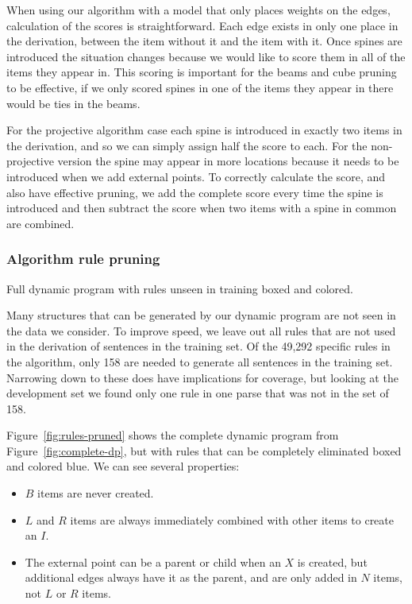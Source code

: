When using our algorithm with a model that only places weights on the edges, calculation of the scores is straightforward.
Each edge exists in only one place in the derivation, between the item without it and the item with it.
Once spines are introduced the situation changes because we would like to score them in all of the items they appear in.
This scoring is important for the beams and cube pruning to be effective, if we only scored spines in one of the items they appear in there would be ties in the beams.

For the projective algorithm case each spine is introduced in exactly two items in the derivation, and so we can simply assign half the score to each.
For the non-projective version the spine may appear in more locations because it needs to be introduced when we add external points.
To correctly calculate the score, and also have effective pruning, we add the complete score every time the spine is introduced and then subtract the score when two items with a spine in common are combined.

\subsubsection{Algorithm rule pruning}

\begin{algorithm}

\caption{\label{fig:rules-pruned}
Full dynamic program with rules unseen in training boxed and colored.
}
\end{algorithm}

Many structures that can be generated by our dynamic program are not seen in the data we consider.
To improve speed, we leave out all rules that are not used in the derivation of sentences in the training set.
Of the 49,292 specific rules in the algorithm, only 158 are needed to generate all sentences in the training set.
Narrowing down to these does have implications for coverage, but looking at the development set we found only one rule in one parse that was not in the set of 158.

Figure~\ref{fig:rules-pruned} shows the complete dynamic program from Figure~\ref{fig:complete-dp}, but with rules that can be completely eliminated boxed and colored blue.
We can see several properties:

\begin{itemize}
  \item $B$ items are never created.
  \item $L$ and $R$ items are always immediately combined with other items to create an $I$.
  \item The external point can be a parent or child when an $X$ is created, but additional edges always have it as the parent, and are only added in $N$ items, not $L$ or $R$ items.
\end{itemize}

